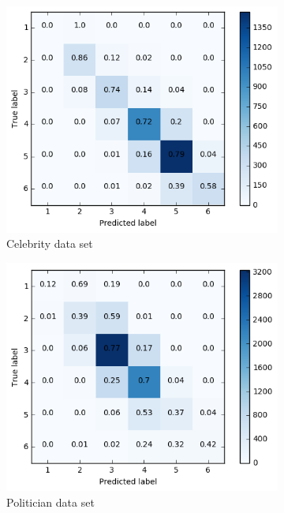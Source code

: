 \begin{figure}[h]
\begin{subfigure}{.4\textwidth}
  \includegraphics[width=.95\linewidth]{img/celeb_d1_cm_favorites}
  \caption{Celebrity data set}
  \label{fig:d1_fav_distr_sub1}
\end{subfigure}%
\begin{subfigure}{.4\textwidth}
  \includegraphics[width=.95\linewidth]{img/polit_d1_cm_favorites}
  \caption{Politician data set}
  \label{fig:d1_fav_distr_sub2}
\end{subfigure}
\begin{subfigure}{.4\textwidth}

\end{subfigure}
\end{figure}
